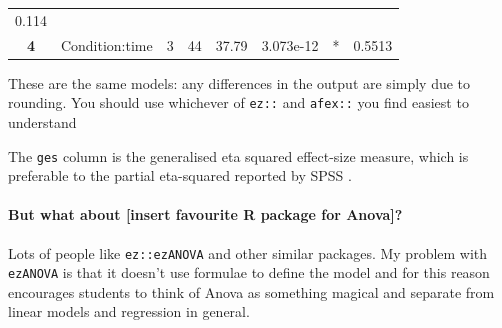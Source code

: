 \documentclass[]{article}
\let\oldparagraph\paragraph
\renewcommand{\paragraph}[1]{\oldparagraph{#1}\mbox{}}
\theoremstyle{definition}
\theoremstyle{definition}
\theoremstyle{definition}
\theoremstyle{remark}
\begin{document}
\begin{longtable}[]{@{}cccccccc@{}}
\begin{minipage}[t]{0.08\columnwidth}
0.114\strut
\end{minipage}\tabularnewline
\begin{minipage}[t]{0.10\columnwidth}\centering\strut
\textbf{4}\strut
\end{minipage} & \begin{minipage}[t]{0.18\columnwidth}\centering\strut
Condition:time\strut
\end{minipage} & \begin{minipage}[t]{0.06\columnwidth}\centering\strut
3\strut
\end{minipage} & \begin{minipage}[t]{0.06\columnwidth}\centering\strut
44\strut
\end{minipage} & \begin{minipage}[t]{0.08\columnwidth}\centering\strut
37.79\strut
\end{minipage} & \begin{minipage}[t]{0.13\columnwidth}\centering\strut
3.073e-12\strut
\end{minipage} & \begin{minipage}[t]{0.08\columnwidth}\centering\strut
*\strut
\end{minipage} & \begin{minipage}[t]{0.08\columnwidth}\centering\strut
0.5513\strut
\end{minipage}\tabularnewline
\bottomrule
\end{longtable}

{These are the same models: any differences in the output are simply due
to rounding. You should use whichever of \texttt{ez::} and
\texttt{afex::} you find easiest to understand}

The \texttt{ges} column is the generalised eta squared effect-size
measure, which is preferable to the partial eta-squared reported by SPSS
\citep{bakeman2005recommended}.

\paragraph{But what about {[}insert favourite R package for
Anova{]}?}\label{but-what-about-insert-favourite-r-package-for-anova}

Lots of people like \texttt{ez::ezANOVA} and other similar packages. My
problem with \texttt{ezANOVA} is that it doesn't use formulae to define
the model and for this reason encourages students to think of Anova as
something magical and separate from linear models and regression in
general.
\end{document}
